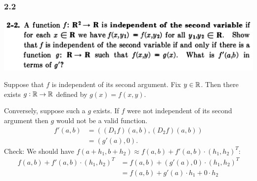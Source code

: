 
\subsubsection*{2.2}
\begin{mdframed}
  \includegraphics[width=400pt]{img/calculus-spivak--2-2.png}
\end{mdframed}
Suppose that $f$ is independent of its second argument. Fix $y \in \mathbb{R}$. Then there exists
$g:\mathbb{R} \to \mathbb{R}$ defined by $g(x) = f(x, y)$.

Conversely, suppose such a $g$ exists. If $f$ were not independent of its second argument then $g$
would not be a valid function.
\begin{align*}
  f'(a, b) &= ((D_1 f)(a, b), (D_2 f)(a, b)) \\
           &= (g'(a), 0).
\end{align*}
Check: We should have $f(a + h_1, b + h_2) \approx f(a, b) + f'(a, b) \cdot (h_1, h_2)^T$:
\begin{align*}
  f(a, b) + f'(a, b) \cdot (h_1, h_2)^T
  &= f(a, b) + (g'(a), 0) \cdot (h_1, h_2)^T \\
  &= f(a, b) + g'(a)\cdot h_1 + 0\cdot h_2
\end{align*}
